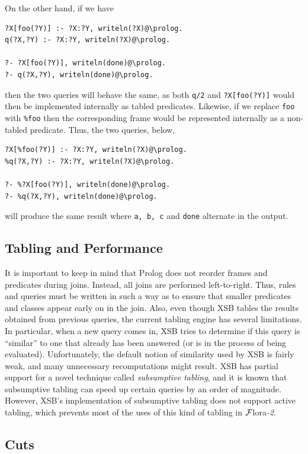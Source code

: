 \documentclass[11pt]{article}
\newcommand{\FLORA}{{\mbox{\sc ${\cal F}${lora}\rm\emph{-2}}}\xspace}
\newcommand{\FLSYSTEM}{\FLORA}
\begin{document}
On the other hand, if we have
\begin{verbatim}
?X[foo(?Y)] :- ?X:?Y, writeln(?X)@\prolog.
q(?X,?Y) :- ?X:?Y, writeln(?X)@\prolog.

?- ?X[foo(?Y)], writeln(done)@\prolog.
?- q(?X,?Y), writeln(done)@\prolog.
\end{verbatim}
then the two queries will behave the same, as both {\tt q/2} and
\verb|?X[foo(?Y)]| would then be implemented internally as tabled predicates.
Likewise, if we replace {\tt foo} with {\tt \%foo} then the corresponding
frame would be represented internally as a non-tabled predicate.
Thus, the two queries, below,
\begin{verbatim}
?X[%foo(?Y)] :- ?X:?Y, writeln(?X)@\prolog.
%q(?X,?Y) :- ?X:?Y, writeln(?X)@\prolog.

?- %?X[foo(?Y)], writeln(done)@\prolog.
?- %q(?X,?Y), writeln(done)@\prolog.
\end{verbatim}
will produce the same result where {\tt a, b, c} and {\tt done}
alternate in the output.

\subsection{Tabling and Performance}

It is important to keep in mind that Prolog does not reorder frames
and predicates during joins. Instead, all joins are performed
left-to-right.  Thus, rules and queries must be written in such a way as to
ensure that smaller predicates and classes appear early on in the join.
Also, even though XSB tables the results obtained from previous queries,
the current tabling engine has several limitations. In particular, when a
new query comes in, XSB tries to determine if this query is ``similar'' to
one that already has been answered (or is in the process of being
evaluated).  Unfortunately, the default notion of similarity used by XSB is
fairly weak, and many unnecessary recomputations might result. XSB has
partial support for a
novel technique called \emph{subsumptive tabling}, and
it is known that subsumptive tabling can speed up
certain queries by an order of magnitude. However, XSB's implementation
of subsumptive tabling does not support active tabling, which prevents
most of the uses of this kind of tabling in \FLSYSTEM.


\subsection{Cuts}
\end{document}
